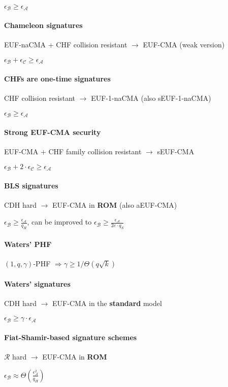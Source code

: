 \documentclass[oneside]{book}
\newcommand{\cA}[0]{\mathcal{A}}
\newcommand{\cB}[0]{\mathcal{B}}
\newcommand{\cC}[0]{\mathcal{C}}
\newcommand{\epsA}[0]{\epsilon_\cA}
\newcommand{\epsB}[0]{\epsilon_\cB}
\newcommand{\epsC}[0]{\epsilon_\cC}
\begin{document}
$\epsB \ge \epsA$

\paragraph{Chameleon signatures}
EUF-naCMA + CHF collision resistant $\rightarrow$ EUF-CMA (weak version)

$\epsB + \epsC \ge \epsA$

\paragraph{CHFs are one-time signatures}
CHF collision resistant $\rightarrow$ EUF-1-naCMA (also sEUF-1-naCMA)

$\epsB \ge \epsA$

\paragraph{Strong EUF-CMA security}
EUF-CMA + CHF family collision resistant $\rightarrow$ sEUF-CMA

$\epsB + 2\cdot \epsC \ge \epsA$

\paragraph{BLS signatures}
CDH hard $\rightarrow$ EUF-CMA in \textbf{ROM} (also aEUF-CMA)

$\epsB \ge \frac{\epsA}{q_H}$, can be improved to $\epsB \ge \frac{\epsA}{2e\cdot q_S}$

\paragraph{Waters' PHF}
$(1, q, \gamma)$-PHF $\Rightarrow \gamma \ge 1/\Theta(q\sqrt{k})$

\paragraph{Waters' signatures}
CDH hard $\rightarrow$ EUF-CMA in the \textbf{standard} model

$\epsB \ge \gamma \cdot \epsA$

\paragraph{Fiat-Shamir-based signature schemes}
$\mathcal{R}$ hard $\rightarrow$ EUF-CMA in \textbf{ROM}

$\epsB \approx \Theta(\frac{\epsA^2}{q_H})$
\end{document}
